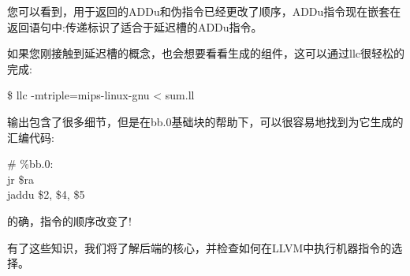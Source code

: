 您可以看到，用于返回的ADDu和伪指令已经更改了顺序，ADDu指令现在嵌套在返回语句中:传递标识了适合于延迟槽的ADDu指令。\par

如果您刚接触到延迟槽的概念，也会想要看看生成的组件，这可以通过llc很轻松的完成:\par

\begin{tcolorbox}[colback=white,colframe=black]
\$ llc -mtriple=mips-linux-gnu  < sum.ll
\end{tcolorbox}

输出包含了很多细节，但是在bb.0基础块的帮助下，可以很容易地找到为它生成的汇编代码:\par

\begin{tcolorbox}[colback=white,colframe=black]
\# \%bb.0: \\
\hspace*{2cm}jr\hspace{1cm} \$ra \\
\hspace*{2cm}jaddu\hspace{0.5cm} \$2, \$4, \$5
\end{tcolorbox}

的确，指令的顺序改变了!\par

有了这些知识，我们将了解后端的核心，并检查如何在LLVM中执行机器指令的选择。\par











